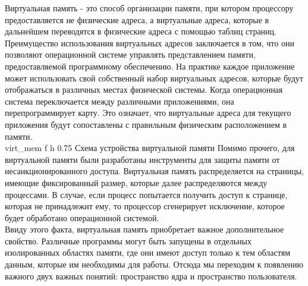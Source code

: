 Виртуальная память - это способ организации памяти, при котором процессору предоставляется не физические адреса, а виртуальные адреса, которые в дальнейшем переводятся в физические адреса с помощью таблиц страниц.
\\
Преимущество использования виртуальных адресов заключается в том,
что они позволяют операционной системе управлять представлением памяти,
предоставляемой программному обеспечению.
На практике каждое приложение может использовать свой собственный набор виртуальных адресов,
которые будут отображаться в различных местах физической системы.
Когда операционная система переключается между различными приложениями, она перепрограммирует карту.
Это означает, что виртуальные адреса для текущего приложения будут сопоставлены с правильным физическим расположением в памяти\cite{arm-virt}.\\

{virt_mem} %
{f}
{h}
{0.75\textwidth} %
{Схема устройства виртуальной памяти} %
\newpage
Помимо прочего, для виртуальной памяти были разработаны инструменты для защиты памяти от несанкционированного доступа.
Виртуальная память распределяется на страницы, имеющие фиксированный размер, которые далее распределяются между процессами.
В случае, если процесс попытается получить доступ к странице, которая не принадлежит ему, то процессор сгенерирует исключение, которое будет обработано операционной системой.
\\
Ввиду этого факта, виртуальная память приобретает важное дополнительное свойство.
Различные программы могут быть запущены в отдельных изолированных областях памяти, где они имеют доступ только к тем областям данным,
которые им необходимы для работы.
Отсюда мы переходим к появлению важного двух важных понятий: пространство ядра и пространство пользователя.
\newpage
